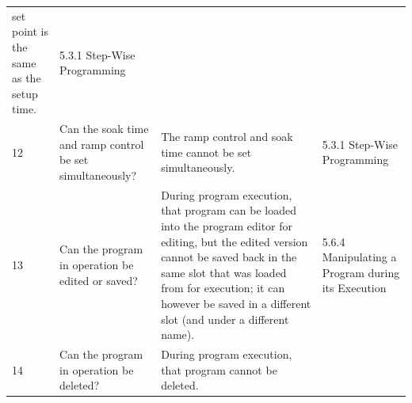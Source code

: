 \begin{longtable}[]{@{}|l|l|l|l|@{}}
\begin{minipage}[t]{0.33\columnwidth}
set point is the same as the setup time.\strut
\end{minipage} & \begin{minipage}[t]{0.17\columnwidth}\raggedright
5.3.1 Step-Wise Programming\strut
\end{minipage}\tabularnewline
 \begin{minipage}[t]{0.08\columnwidth}\raggedright
12\strut
\end{minipage} & \begin{minipage}[t]{0.30\columnwidth}\raggedright
Can the soak time and ramp control be set simultaneously?\strut
\end{minipage} & \begin{minipage}[t]{0.33\columnwidth}\raggedright
The ramp control and soak time cannot be set simultaneously.\strut
\end{minipage} & \begin{minipage}[t]{0.17\columnwidth}\raggedright
5.3.1 Step-Wise Programming\strut
\end{minipage}\tabularnewline
 \begin{minipage}[t]{0.08\columnwidth}\raggedright
13\strut
\end{minipage} & \begin{minipage}[t]{0.30\columnwidth}\raggedright
Can the program in operation be edited or saved?\strut
\end{minipage} & \begin{minipage}[t]{0.33\columnwidth}\raggedright
During program execution, that program can be loaded into the program
editor for editing, but the edited version cannot be saved back in the
same slot that was loaded from for execution; it can however be saved in
a different slot (and under a different name).\strut
\end{minipage} & \begin{minipage}[t]{0.17\columnwidth}\raggedright
5.6.4 Manipulating a Program during its Execution\strut
\end{minipage}\tabularnewline
 \begin{minipage}[t]{0.08\columnwidth}\raggedright
14\strut
\end{minipage} & \begin{minipage}[t]{0.30\columnwidth}\raggedright
Can the program in operation be deleted?\strut
\end{minipage} & \begin{minipage}[t]{0.33\columnwidth}\raggedright
During program execution, that program cannot be deleted.\strut
\end{minipage} & \begin{minipage}[t]{0.17\columnwidth}\raggedright

\end{minipage}
\end{longtable}
